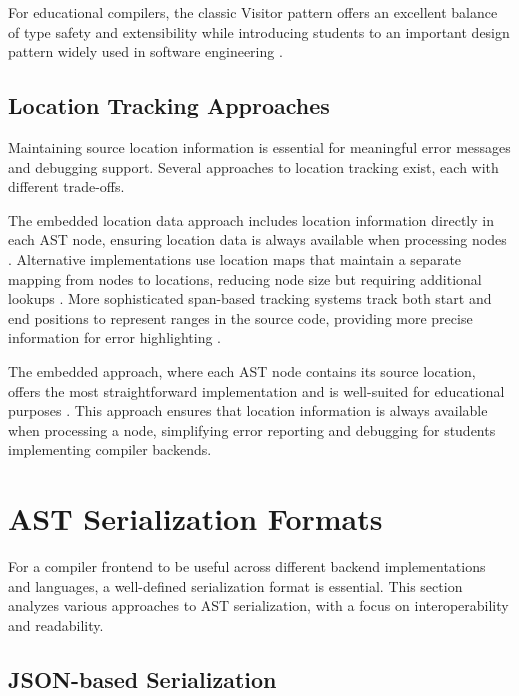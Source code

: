 For educational compilers, the classic Visitor pattern offers an excellent balance of type safety and extensibility while introducing students to an important design pattern widely used in software engineering \cite{gamma1995design}.

\subsection{Location Tracking Approaches}

Maintaining source location information is essential for meaningful error messages and debugging support. Several approaches to location tracking exist, each with different trade-offs.

The embedded location data approach includes location information directly in each AST node, ensuring location data is always available when processing nodes \cite{appel2004modern}. Alternative implementations use location maps that maintain a separate mapping from nodes to locations, reducing node size but requiring additional lookups \cite{lesk1975lex}. More sophisticated span-based tracking systems track both start and end positions to represent ranges in the source code, providing more precise information for error highlighting \cite{parr2013definitive}.

The embedded approach, where each AST node contains its source location, offers the most straightforward implementation and is well-suited for educational purposes \cite{appel2004modern}. This approach ensures that location information is always available when processing a node, simplifying error reporting and debugging for students implementing compiler backends.

\pagebreak







\section{AST Serialization Formats}

For a compiler frontend to be useful across different backend implementations and languages, a well-defined serialization format is essential. This section analyzes various approaches to AST serialization, with a focus on interoperability and readability.

\subsection{JSON-based Serialization}


